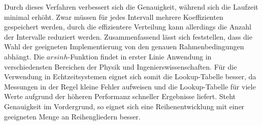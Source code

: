 \documentclass[course=erap] {aspdoc}
\begin{document}
    Durch dieses Verfahren verbessert sich die Genauigkeit, während sich die Laufzeit minimal erhöht.
    Zwar müssen für jedes Intervall mehrere Koeffizienten gespeichert werden, durch die effizientere Verteilung kann allerdings die Anzahl der Intervalle reduziert werden. 
    \newline
    \newline
    Zusammenfassend lässt sich feststellen, dass die Wahl der geeigneten Implementierung von den genauen Rahmenbedingungen abhängt.
    Die $arsinh$-Funktion findet in erster Linie Anwendung in verschiedensten Bereichen der Physik und Ingenierswissenschaften.
    Für die Verwendung in Echtzeitsystemen eignet sich somit die Lookup-Tabelle besser, da Messungen in der Regel kleine Fehler aufweisen und die Lookup-Tabelle für viele Werte aufgrund der höheren Performanz schneller Ergebnisse liefert.
    Steht Genauigkeit im Vordergrund, so eignet sich eine Reihenentwicklung mit einer geeigneten Menge an Reihengliedern besser.

    
    
\end{document}

